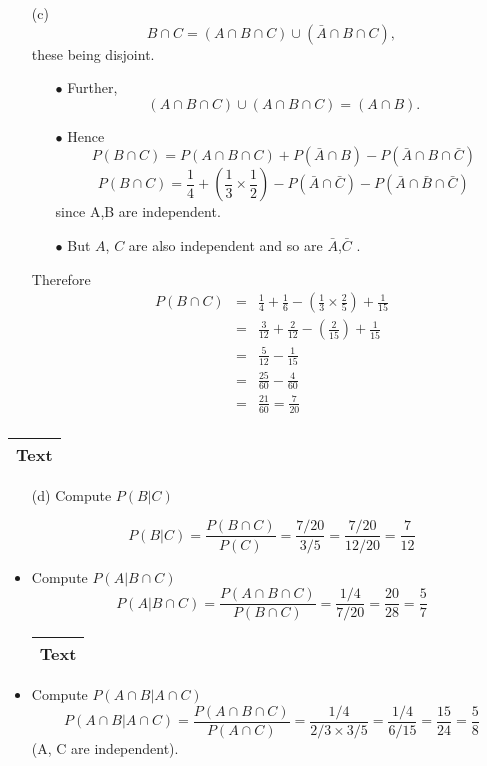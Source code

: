 \documentclass[a4paper,12pt]{article}
\begin{document}
\begin{itemize}
\item[(c)]  \[B\cap C = (A\cap B\cap C)\cup(\bar{A} \cap B\cap C), \] these being disjoint.
\begin{itemize}
\item[$\bullet$] Further, \[(A\cap B \cap C)\cup(A\cap B \cap C) = (A\cap B) .\]
\item[$\bullet$] Hence \[P(B \cap C) = P(A\cap B \cap C) + P(\bar{A} \cap B) - P(\bar{A} \cap B \cap \bar{C})\]
\[P(B \cap C) =  \frac{1}{4}+ \left( \frac{1}{3} \times \frac{1}{2} \right) 
- P (\bar{A} \cap \bar{C} ) - P (\bar{A} \cap \bar{B} \cap \bar{C}) \]
since A,B are independent.

\item[$\bullet$] But $A$, $C$ are also independent and so are $\bar{A}$,$\bar{C}$ .
\end{itemize}

Therefore 
\begin{eqnarray*}
P( B \cap C)  &=& \frac{1}{4} +\frac{1}{6} -\left( \frac{1}{3} \times \frac{2}{5} \right) + \frac{1}{15} \\
&=& \frac{3}{12} +\frac{2}{12} -\left(  \frac{2}{15} \right) + \frac{1}{15}
\\
&=& \frac{5}{12} -\frac{1}{15}\\
&=& \frac{25}{60} -\frac{4}{60}\\
&=& \frac{21}{60} = \frac{7}{20}\\
\end{eqnarray*}

\end{itemize}



\begin{table}[ht!]
 \centering
 \begin{tabular}{|p{15cm}|}
 \hline
\noindent Text
\\ \hline
  \end{tabular}
\end{table}
\begin{itemize}
\item[(d)] Compute $P (B | C)$

\[
P (B | C) = \frac{P( B \cap C)}{P (C)} = \frac{7/20}{3/5} = \frac{7/20}{12/20} = \frac{7}{12}\]

\item Compute $P (A | B  \cap C)$ 
\[
P (A | B  \cap C) = \frac{P( A \cap B \cap C)}{P (B \cap C)} = \frac{1/4}{7/20} = \frac{20}{28} = \frac{5}{7}\]

\begin{table}[ht!]
 \centering
 \begin{tabular}{|p{15cm}|}
 \hline
\noindent Text
\\ \hline
  \end{tabular}
\end{table}
\item Compute $P (A \cap B | A \cap C)$ 
\[
P (A \cap B | A \cap C) = \frac{P( A \cap B \cap C)}{P (A \cap C)} = \frac{1/4}{2/3 \times 3/5} = \frac{1/4}{6/15} = \frac{15}{24} = \frac{5}{8}\]
(A, C are independent).
\end{itemize}
\end{document}
